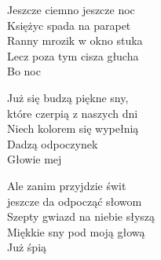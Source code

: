 \begin{text}
    Jeszcze ciemno jeszcze noc\\
    Księżyc spada na parapet\\
    Ranny mrozik w okno stuka\\
    Lecz poza tym cisza głucha\\
    Bo noc

    Już się budzą piękne sny,\\
    które czerpią z naszych dni\\
    Niech kolorem się wypełnią\\
    Dadzą odpoczynek\\
    Głowie mej

    Ale zanim przyjdzie świt\\
    jeszcze da odpocząć słowom\\
    Szepty gwiazd na niebie słyszą\\
    Miękkie sny pod moją głową\\
    Już śpią
\end{text}
\begin{chord}

\end{chord}
